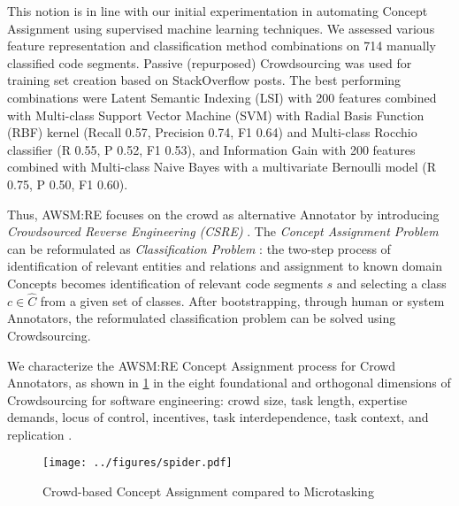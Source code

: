 This notion is in line with our initial experimentation in automating \gls{Concept Assignment} using supervised machine learning techniques.
We assessed various feature representation and classification method combinations on 714 manually classified code segments.
Passive (repurposed) \gls{Crowdsourcing} was used for training set creation based on StackOverflow posts.
The best performing combinations were Latent Semantic Indexing (LSI) with 200 features combined with Multi-class Support Vector Machine (SVM) with Radial Basis Function (RBF) kernel (Recall 0.57, Precision 0.74, F1 0.64) and Multi-class Rocchio classifier \autocite{Joachims1997Rocchio} (R 0.55, P 0.52, F1 0.53), and Information Gain with 200 features combined with Multi-class Naive Bayes with a multivariate Bernoulli model \autocite{McCallum1998NB} (R 0.75, P 0.50, F1 0.60).

Thus, AWSM:RE focuses on the crowd as alternative Annotator by introducing \emph{Crowdsourced Reverse Engineering (CSRE)} \autocite{Heil2018CSRE,Heil2019CSRECCIS}.
The \emph{Concept Assignment Problem} \autocite{Biggerstaff1993ConceptAssignmentICSE} can be reformulated as \emph{Classification Problem} \autocite{Heil2018CSRE,Heil2019CSRECCIS}: the two-step process of identification of relevant entities and relations and assignment to known domain \glspl{Concept} becomes identification of relevant code segments \(s\) and selecting a class \(c \in \hat C\) from a given set of classes.
After bootstrapping, through human or system Annotators, the reformulated classification problem can be solved using \gls{Crowdsourcing}.

We characterize the AWSM:RE \gls{Concept Assignment} process for Crowd Annotators, as shown in \cref{fig:awsm.re.crowddimensions} in the eight foundational and orthogonal dimensions of \gls{Crowdsourcing} for software engineering: crowd size, task length, expertise demands, locus of control, incentives, task interdependence, task context, and replication \autocite{Latoza2016}.

\begin{figure} [h!]
\hypertarget{fig:awsm.re.crowddimensions}{%
\centering
\texttt{[image: ../figures/spider.pdf]}
\caption[Crowd-based Concept Assignment compared to Microtasking]{Crowd-based Concept Assignment compared to Microtasking \autocite{Heil2018CSRE}}\label{fig:awsm.re.crowddimensions}
}
\end{figure}

